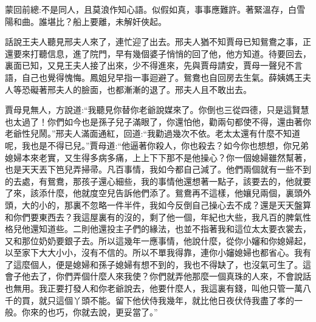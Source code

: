 

\begin{parag}
    \begin{note}蒙回前總:不是同人，且莫浪作知心語。似假如真，事事應難許。著緊溫存，白雪陽和曲。誰堪比？船上要離，未解奸俠起。\end{note}
\end{parag}


\begin{parag}
    話說王夫人聽見邢夫人來了，連忙迎了出去。邢夫人猶不知賈母已知鴛鴦之事，正還要來打聽信息，進了院門，早有幾個婆子悄悄的回了他，他方知道。待要回去，裏面已知，又見王夫人接了出來，少不得進來，先與賈母請安，賈母一聲兒不言語，自己也覺得愧悔。鳳姐兒早指一事迴避了。鴛鴦也自回房去生氣。薛姨媽王夫人等恐礙著邢夫人的臉面，也都漸漸的退了。邢夫人且不敢出去。
\end{parag}


\begin{parag}
    賈母見無人，方說道:“我聽見你替你老爺說媒來了。你倒也三從四德，只是這賢慧也太過了！你們如今也是孫子兒子滿眼了，你還怕他，勸兩句都使不得，還由著你老爺性兒鬧。”邢夫人滿面通紅，回道:“我勸過幾次不依。老太太還有什麼不知道呢，我也是不得已兒。”賈母道:“他逼著你殺人，你也殺去？如今你也想想，你兄弟媳婦本來老實，又生得多病多痛，上上下下那不是他操心？你一個媳婦雖然幫著，也是天天丟下笆兒弄掃帚。凡百事情，我如今都自己減了。他們兩個就有一些不到的去處，有鴛鴦，那孩子還心細些，我的事情他還想著一點子，該要去的，他就要了來，該添什麼，他就度空兒告訴他們添了。鴛鴦再不這樣，他孃兒兩個，裏頭外頭，大的小的，那裏不忽略一件半件，我如今反倒自己操心去不成？還是天天盤算和你們要東西去？我這屋裏有的沒的，剩了他一個，年紀也大些，我凡百的脾氣性格兒他還知道些。二則他還投主子們的緣法，也並不指著我和這位太太要衣裳去，又和那位奶奶要銀子去。所以這幾年一應事情，他說什麼，從你小嬸和你媳婦起，以至家下大大小小，沒有不信的。所以不單我得靠，連你小嬸媳婦也都省心。我有了這麼個人，便是媳婦和孫子媳婦有想不到的，我也不得缺了，也沒氣可生了。這會子他去了，你們弄個什麼人來我使？你們就弄他那麼一個真珠的人來，不會說話也無用。我正要打發人和你老爺說去，他要什麼人，我這裏有錢，叫他只管一萬八千的買，就只這個丫頭不能。留下他伏侍我幾年，就比他日夜伏侍我盡了孝的一般。你來的也巧，你就去說，更妥當了。”
\end{parag}


